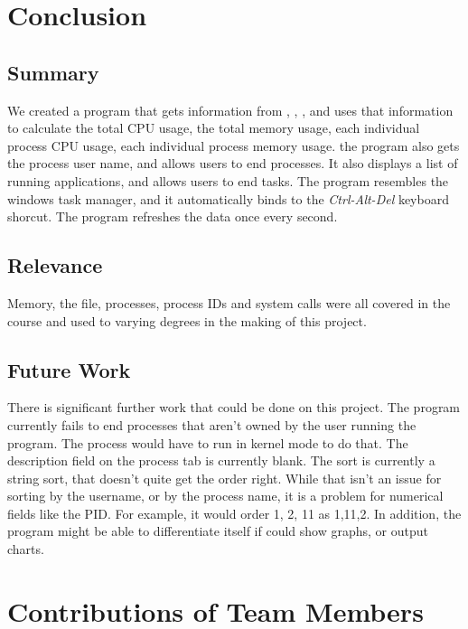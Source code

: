 \documentclass[12pt]{article}
\begin{document}
	\section{Conclusion}
	
	\subsection{Summary}
	We created a program that gets information from , , ,  and uses that information to calculate the total CPU usage, the total memory usage, each individual process CPU usage, each individual process memory usage. the program also gets the process user name, and allows users to end processes. It also displays a list of running applications, and allows users to end tasks. The program resembles the windows task manager, and it automatically binds to the \emph{Ctrl-Alt-Del} keyboard shorcut. The program refreshes the data once every second.
	
	\subsection{Relevance}
	Memory, the  file, processes, process IDs and system calls were all covered in the course and used to varying degrees in the making of this project.
	
	\subsection{Future Work}
	There is significant further work that could be done on this project. The program currently fails to end processes that aren't owned by the user running the program. The process would have to run in kernel mode to do that. The description field on the process tab is currently blank. The sort is currently a string sort, that doesn't quite get the order right. While that isn't an issue for sorting by the username, or by the process name, it is a problem for numerical fields like the PID. For example, it would order 1, 2, 11 as 1,11,2. In addition, the program might be able to differentiate itself if could show graphs, or output charts. 
	
	
	\setcounter{secnumdepth}{0}
	\section{Contributions of Team Members}
\end{document}
